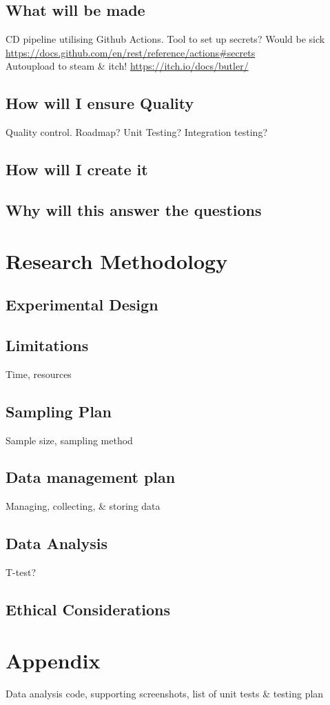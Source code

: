 \documentclass[lettersize,journal]{IEEEtran}
\begin{document}
    \subsection{What will be made}
        CD pipeline utilising Github Actions. Tool to set up secrets? Would be sick \url{https://docs.github.com/en/rest/reference/actions#secrets} \\
        Autoupload to steam \& itch! \url{https://itch.io/docs/butler/}

    \subsection{How will I ensure Quality}
        Quality control. Roadmap? Unit Testing? Integration testing?

    \subsection{How will I create it}

    \subsection{Why will this answer the questions}

\section{Research Methodology}
    \subsection{Experimental Design}

    \subsection{Limitations}
        Time, resources

    \subsection{Sampling Plan}
        Sample size, sampling method

    \subsection{Data management plan}
        Managing, collecting, \& storing data

    \subsection{Data Analysis}
        T-test?
    \subsection{Ethical Considerations}

\section{Appendix}
    Data analysis code, supporting screenshots, list of unit tests \& testing plan



\end{document}
